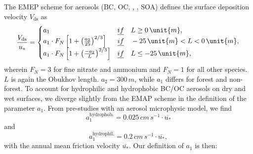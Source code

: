 \documentclass[gmd, manuscript]{copernicus}
\begin{document}
The EMEP scheme for aerosols (BC, OC, , , SOA) defines the surface deposition velocity $V_\text{ds}$ as
\begin{equation}
  \frac{V_\text{ds}}{u_*} =
  \begin{cases}
    a_1 &  \emph{if} \quad L \ge 0\,\unit{m}, \\
    a_1 \cdot F_N \left[ 1 + \left(\frac{a_2}{25}\right)^{2/3}\right] & \emph{if} \quad -25\,\unit{m} < L < 0\,\unit{m}, \\
    a_1 \cdot F_N \left[ 1 + \left(\frac{-a_2}{L}\right)^{2/3}\right] & \emph{if} \quad L \le -25\,\unit{m}, \\
  \end{cases}
\end{equation}
wherein $F_N = 3$ for fine nitrate and ammonium and $F_N = 1$ for all other species. $L$ is again the Obukhov length. $a_2 = 300\,\unit{m}$, while $a_1$ differs for forest and non-forest. To account for hydrophilic and hydrophobic BC/OC aerosols on dry and wet surfaces, we diverge slightly from the EMAP scheme in the definition of the parameter $a_1$. From pre-studies with an aerosol microphysic model, we find
\begin{equation}
  a_1^\text{hydrophob.} = 0.025\,\unit{cm\,s^{-1}} \cdot \overline{u_*}
\end{equation}
and
\begin{equation} 
  a_1^\text{hydrophil.} = 0.2\,\unit{cm\,s^{-1}} \cdot \overline{u_*},
\end{equation}
with the annual mean friction velocity $\overline{u_*}$. Our definition of $a_1$ is then:
\end{document}

